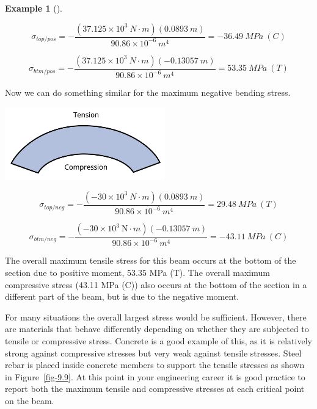 \documentclass[
  letterpaper,
  DIV=11,
  numbers=noendperiod]{scrreprt}
\theoremstyle{definition}
\newtheorem{example}{Example}[chapter]
\theoremstyle{remark}
\begin{document}
\begin{tcolorbox}
\begin{example}[]
\begin{tcolorbox}
\[ \sigma_{top/pos}=-\frac{\left(37.125 \times 10^3{~N}\cdot{m}\right)(0.0893 {~m})}{90.86 \times 10^{-6}{~m}^4}=-36.49{~MPa~(C)} \]

\[ \sigma_{btm/pos}=-\frac{\left(37.125\times10^3{~N}\cdot{m}\right)(-0.13057{~m})}{90.86 \times 10^{-6}{~m}^4}=53.35{~MPa}{~(T)} \]

Now we can do something similar for the maximum negative bending stress.

\begin{center}
\includegraphics[width=2.72917in,height=\textheight]{images/CH9 PNGs/Example 9.2 part 7.png}
\end{center}

\[ \sigma_{top/neg}=-\frac{\left(-30 \times 10^3{~N}\cdot{m}\right)(0.0893{~m})}{90.86 \times 10^{-6}{~m}^4}=29.48{~MPa~(T)} \]

\[ \sigma_{btm/neg}=-\frac{\left(-30 \times 10^3 \mathrm{~N}\cdot{m}\right)(-0.13057{~m})}{90.86 \times 10^{-6}{~m}^4}=-43.11{~MPa}~{(C)} \]

The overall maximum tensile stress for this beam occurs at the bottom of
the section due to positive moment, 53.35 MPa (T). The overall maximum
compressive stress (43.11 MPa (C)) also occurs at the bottom of the
section in a different part of the beam, but is due to the negative
moment.

\end{tcolorbox}

\end{example}

\end{tcolorbox}

For many situations the overall largest stress would be sufficient.
However, there are materials that behave differently depending on
whether they are subjected to tensile or compressive stress. Concrete is
a good example of this, as it is relatively strong against compressive
stresses but very weak against tensile stresses. Steel rebar is placed
inside concrete members to support the tensile stresses as shown in
Figure~\ref{fig-9.9}. At this point in your engineering career it is
good practice to report both the maximum tensile and compressive
stresses at each critical point on the beam.
\end{document}
